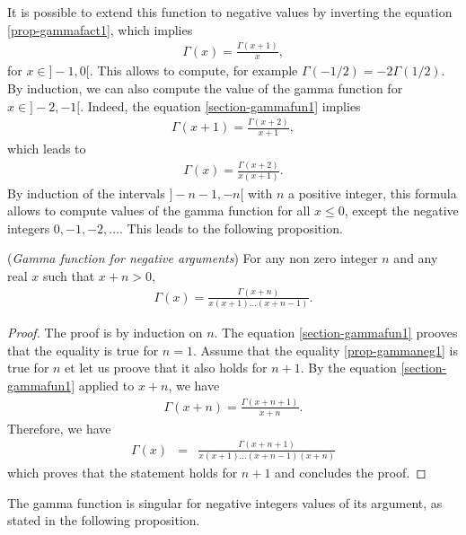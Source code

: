 It is possible to extend this function to negative values by 
inverting the equation \ref{prop-gammafact1}, which implies 
\begin{eqnarray}
\Gamma(x) = \frac{\Gamma(x+1)}{x}, \label{section-gammafun1}
\end{eqnarray}
for $x\in]-1,0[$. This allows to compute, for example $\Gamma(-1/2) = -2\Gamma(1/2)$.
By induction, we can also compute the value of the gamma function for $x\in]-2,-1[$.
Indeed, the equation \ref{section-gammafun1} implies  
\begin{eqnarray}
\Gamma(x+1) = \frac{\Gamma(x+2)}{x+1},
\end{eqnarray}
which leads to 
\begin{eqnarray}
\Gamma(x) = \frac{\Gamma(x+2)}{x(x+1)}.
\end{eqnarray}
By induction of the intervals $]-n-1,-n[$ with $n$ a positive integer, this formula allows to compute 
values of the gamma function for all $x\leq 0$, except the negative 
integers $0, -1, -2, \ldots$. This leads to the following proposition.

\begin{proposition}
(\emph{Gamma function for negative arguments})
\label{prop-gammaneg}
For any non zero integer $n$ and any real $x$ such that $x+n>0$, 
\begin{eqnarray}
\Gamma(x) = \frac{\Gamma(x+n)}{x(x+1)\ldots(x+n-1)}. \label{prop-gammaneg1}
\end{eqnarray}
\end{proposition}

\begin{proof}
The proof is by induction on $n$. The equation \ref{section-gammafun1} prooves that
the equality is true for $n=1$. 
Assume that the equality \ref{prop-gammaneg1} is true for $n$ et let 
us proove that it also holds for $n+1$.
By the equation \ref{section-gammafun1} applied to $x+n$, we have
\begin{eqnarray}
\Gamma(x+n) = \frac{\Gamma(x+n+1)}{x+n}.
\end{eqnarray}
Therefore, we have 
\begin{eqnarray}
\Gamma(x) 
&=& \frac{\Gamma(x+n+1)}{x(x+1)\ldots(x+n-1)(x+n)}
\end{eqnarray}
which proves that the statement holds for $n+1$ and concludes the proof.
\end{proof}

The gamma function is singular for negative integers values of its argument,
as stated in the following proposition.

